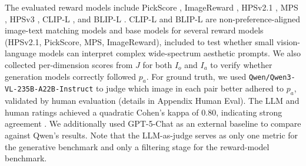 The evaluated reward models include PickScore \cite{kirstain_pick--pic_2023}, ImageReward \cite{xu_imagereward_2023}, HPSv2.1 \cite{wu_human_2023}, MPS \cite{zhang_learning_2024}, HPSv3 \cite{ma_hpsv3_2025}, CLIP-L \cite{radford_learning_2021}, and BLIP-L \cite{li_blip_2022}. CLIP-L and BLIP-L are non-preference-aligned image-text matching models and base models for several reward models (HPSv2.1, PickScore, MPS, ImageReward), included to test whether small vision-language models can interpret complex wide-spectrum aesthetic prompts. We also collected per-dimension scores from $J$ for both $I_o$ and $I_a$ to verify whether generation models correctly followed $p_a$. For ground truth, we used \texttt{Qwen/Qwen3-VL-235B-A22B-Instruct} to judge which image in each pair better adhered to $p_a$, validated by human evaluation (details in Appendix Human Eval). The LLM and human ratings achieved a quadratic Cohen's kappa of 0.80, indicating strong agreement \cite{mchugh_interrater_2012}. We additionally used GPT-5-Chat as an external baseline to compare against Qwen's results. Note that the LLM-as-judge serves as only one metric for the generative benchmark and only a filtering stage for the reward-model benchmark.